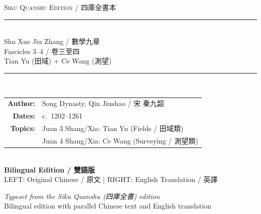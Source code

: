 \documentclass[11pt,a4paper]{article}
\begin{document}
\begin{titlepage}
\centering
\vspace*{2.5cm}

{\fontsize{12}{14}\selectfont\textsc{Siku Quanshu Edition / 四庫全書本}}\\[0.5cm]
{\color{rulecolor}\rule{10cm}{0.5pt}}\\[1cm]

{\fontsize{26}{32}\selectfont\textcolor{titlecolor}{Shu Xue Jiu Zhang / 數學九章}}\\[0.8cm]
{\fontsize{16}{20}\selectfont\textcolor{sectioncolor}{Fascicles 3--4 / 卷三至四}}\\[0.3cm]
{\fontsize{13}{16}\selectfont\textcolor{subsectioncolor}{Tian Yu (田域) + Ce Wang (測望)}}\\[1.5cm]

{\color{rulecolor}\rule{10cm}{0.5pt}}\\[1cm]

{\large
\begin{tabular}{rl}
\textbf{Author:} & Song Dynasty, Qin Jiushao / 宋 \enspace 秦九韶 \\[0.5em]
\textbf{Dates:} & c.\ 1202--1261 \\[0.5em]
\textbf{Topics:} & Juan 3 Shang/Xia: Tian Yu (Fields / 田域類) \\[0.3em]
               & Juan 4 Shang/Xia: Ce Wang (Surveying / 測望類) \\
\end{tabular}
}\\[2cm]

{\large\textbf{Bilingual Edition / 雙語版}}\\[0.5cm]
{\normalsize LEFT: Original Chinese / 原文 \quad | \quad RIGHT: English Translation / 英譯}\\[1.5cm]


\vfill
{\small\textit{Typeset from the Siku Quanshu (四庫全書) edition}}\\
{\small Bilingual edition with parallel Chinese text and English translation}

\end{titlepage}
\end{document}
